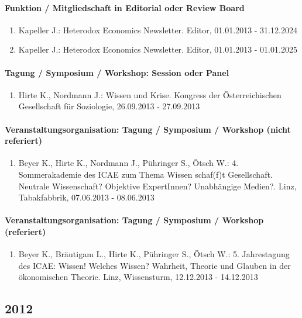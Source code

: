 \paragraph{Funktion / Mitgliedschaft in Editorial oder Review Board} 
\begin{enumerate}[leftmargin=*, labelsep=0.5cm] 
 	 \item Kapeller J.: Heterodox Economics Newsletter. Editor, 01.01.2013 - 31.12.2024 
	 \item Kapeller J.: Heterodox Economics Newsletter. Editor, 01.01.2013 - 01.01.2025 
\end{enumerate} 
\paragraph{Tagung / Symposium / Workshop: Session oder Panel} 
\begin{enumerate}[leftmargin=*, labelsep=0.5cm] 
 	 \item Hirte K., Nordmann J.: Wissen und Krise. Kongress der Österreichischen Gesellschaft für Soziologie, 26.09.2013 - 27.09.2013 
\end{enumerate} 
\paragraph{Veranstaltungsorganisation: Tagung / Symposium / Workshop (nicht referiert)} 
\begin{enumerate}[leftmargin=*, labelsep=0.5cm] 
 	 \item Beyer K., Hirte K., Nordmann J., Pühringer S., Ötsch W.: 4. Sommerakademie des ICAE zum Thema  	  Wissen schaf(f)t Gesellschaft. Neutrale Wissenschaft? Objektive ExpertInnen? Unabhängige Medien?. Linz, Tabakfabbrik, 07.06.2013 - 08.06.2013 
\end{enumerate} 
\paragraph{Veranstaltungsorganisation: Tagung / Symposium / Workshop (referiert)} 
\begin{enumerate}[leftmargin=*, labelsep=0.5cm] 
 	 \item Beyer K., Bräutigam L., Hirte K., Pühringer S., Ötsch W.: 5. Jahrestagung des ICAE: Wissen! Welches Wissen? Wahrheit, Theorie und Glauben in der ökonomischen Theorie. Linz, Wissensturm, 12.12.2013 - 14.12.2013 
\end{enumerate} 
\subsection*{2012} 
